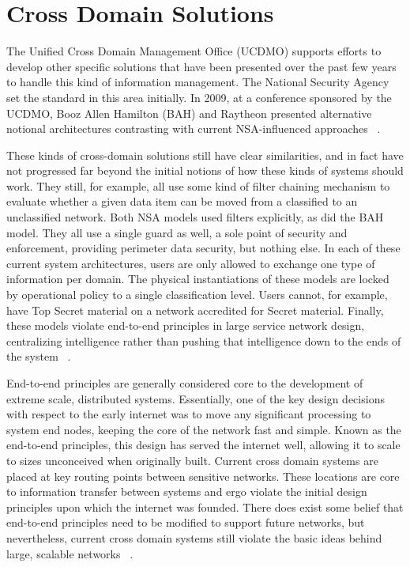\section{Cross Domain Solutions}
The Unified Cross Domain Management Office (UCDMO) supports efforts to develop other specific solutions that have been presented over the past few years to handle this kind of information management.  The National Security Agency set the standard in this area initially.  In 2009, at a conference sponsored by the UCDMO, Booz Allen Hamilton (BAH) and Raytheon presented alternative notional architectures contrasting with current NSA-influenced approaches ~\cite{proposal:nsa-arch,proposal:gig-arch,proposal:bah-arch,proposal:raytheon-arch}.

These kinds of cross-domain solutions still have clear similarities, and in fact have not progressed far beyond the initial notions of how these kinds of systems should work.  They still, for example, all use some kind of filter chaining mechanism to evaluate whether a given data item can be moved from a classified to an unclassified network.  Both NSA models used filters explicitly, as did the BAH model.  They all use a single guard as well, a sole point of security and enforcement, providing perimeter data security, but nothing else.  In each of these current system architectures, users are only allowed to exchange one type of information per domain.  The physical instantiations of these models are locked by operational policy to a single classification level.  Users cannot, for example, have Top Secret material on a network accredited for Secret material.  Finally, these models violate end-to-end principles in large service network design, centralizing intelligence rather than pushing that intelligence down to the ends of the system ~\cite{Clark:1995:DPD:205447.205458}.

End-to-end principles are generally considered core to the development of extreme scale, distributed systems.  Essentially, one of the key design decisions with respect to the early internet was to move any significant processing to system end nodes, keeping the core of the network fast and simple.  Known as the end-to-end principles, this design has served the internet well, allowing it to scale to sizes unconceived when originally built.  Current cross domain systems are placed at key routing points between sensitive networks.  These locations are core to information transfer between systems and ergo violate the initial design principles upon which the internet was founded.  There does exist some belief that end-to-end principles need to be modified to support future networks, but nevertheless, current cross domain systems still violate the basic ideas behind large, scalable networks ~\cite{Blumenthal:2001:RDI:383034.383037}.

